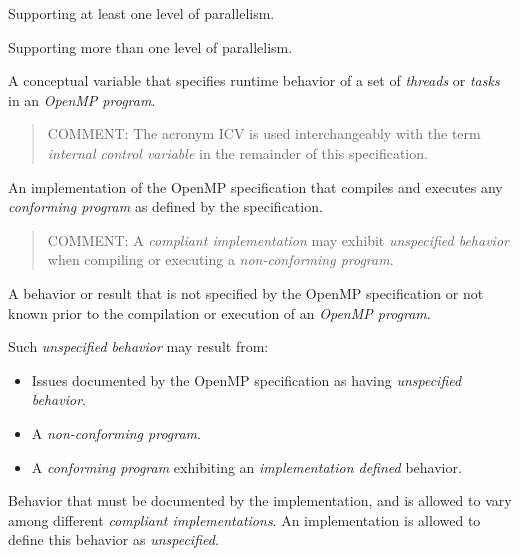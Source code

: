 \glossarydefstart
Supporting at least one level of parallelism.
\glossarydefend
\bigskip

\glossarydefstart
Supporting more than one level of parallelism.
\glossarydefend
\bigskip

\glossarydefstart
A conceptual variable that specifies runtime behavior of a set of \emph{threads} 
or \emph{tasks} in an \emph{OpenMP program}.

\begin{quote}
COMMENT: The acronym ICV is used interchangeably with the term 
\emph{internal control variable} in the remainder of this specification.
\end{quote}
\glossarydefend

\glossarydefstart
An implementation of the OpenMP specification that compiles and executes any
\emph{conforming program} as defined by the specification.

\begin{quote}
COMMENT: A \emph{compliant implementation} may exhibit 
\emph{unspecified behavior} when
compiling or executing a \emph{non-conforming program}.
\end{quote}
\glossarydefend

\glossarydefstart
A behavior or result that is not specified by the OpenMP specification or not
known prior to the compilation or execution of an \emph{OpenMP program}.

Such \emph{unspecified behavior} may result from:

\begin{itemize}
\item Issues documented by the OpenMP specification as having 
\emph{unspecified behavior}.

\item A \emph{non-conforming program}.

\item A \emph{conforming program} exhibiting an 
\emph{implementation defined} behavior.
\end{itemize}
\glossarydefend

\glossarydefstart
Behavior that must be documented by the implementation, and is allowed to vary
among different \emph{compliant implementations}. An implementation is allowed to
define this behavior as \emph{unspecified}.

